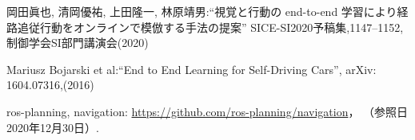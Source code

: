 \documentclass[10pt]{jarticle}
\begin{document}
    \vspace{5truemm}
    {\footnotesize
        \begin{thebibliography}{99}
            
            
            岡田眞也, 清岡優祐, 上田隆一, 林原靖男:``視覚と行動の end-to-end 
            学習により経路追従行動をオンラインで模倣する手法の提案''
            SICE-SI2020予稿集,1147--1152,制御学会SI部門講演会(2020)
            
            Mariusz Bojarski et al:``End to End Learning for Self-Driving Cars'',
            arXiv: 1604.07316,(2016)
            
            
            
            ros-planning, navigation: 
            \url{https://github.com/ros-planning/navigation}， 
            （参照日 2020年12月30日）. 
            
        \end{thebibliography}
    }
    \normalsize
    
\end{document}
